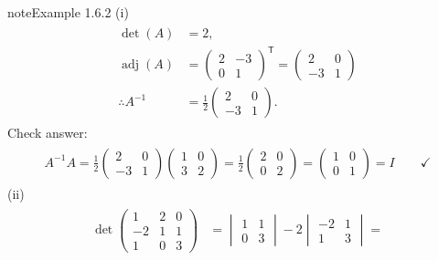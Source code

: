 \documentclass[letterpaper,10pt,english]{jupyterBook}
\begin{document}
\begin{sphinxadmonition}{note}{Example 1.6.2}
\sphinxAtStartPar
(i)
\begin{equation*}
\begin{split} \begin{align*}
    \det(A) &= 2, \\
    \operatorname{adj}(A) &= \begin{pmatrix} 2 & -3 \\ 0 & 1 \end{pmatrix}^\mathsf{T}  = \begin{pmatrix} 2 & 0 \\ -3 & 1\end{pmatrix} \\
    \therefore A^{-1} &= \frac{1}{2}\begin{pmatrix} 2 & 0 \\ -3 & 1\end{pmatrix}.
\end{align*} \end{split}
\end{equation*}
\sphinxAtStartPar
Check answer:
\begin{equation*}
\begin{split} \begin{align*}
    A^{-1}A = \frac{1}{2}\begin{pmatrix} 2 & 0 \\ -3 & 1\end{pmatrix}\begin{pmatrix}1 & 0 \\ 3 & 2\end{pmatrix} = \frac{1}{2} \begin{pmatrix} 2 & 0 \\ 0 & 2 \end{pmatrix} = \begin{pmatrix} 1 & 0 \\ 0 & 1 \end{pmatrix} = I \qquad \checkmark
\end{align*} \end{split}
\end{equation*}
\sphinxAtStartPar
(ii)
\begin{equation*}
\begin{split} \begin{align*}
    \det\begin{pmatrix} 1 & 2 & 0 \\ -2 & 1 & 1 \\ 1 & 0 & 3 \end{pmatrix} &=
    \begin{vmatrix} 1 & 1 \\ 0 & 3 \end{vmatrix}  - 2 \begin{vmatrix}-2 & 1 \\ 1 & 3 \end{vmatrix} =

\end{align*}
\end{split}
\end{equation*}
\end{sphinxadmonition}
\end{document}
